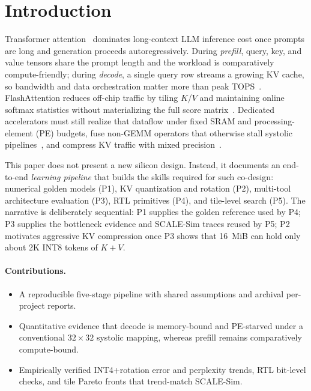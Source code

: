 \documentclass[conference]{IEEEtran}
\begin{document}
\section{Introduction}
\label{sec:intro}

Transformer attention~\cite{vaswani2017attention} dominates long-context LLM inference cost once prompts are long and generation proceeds autoregressively.
During \emph{prefill}, query, key, and value tensors share the prompt length and the workload is comparatively compute-friendly; during \emph{decode}, a single query row streams a growing KV cache, so bandwidth and data orchestration matter more than peak TOPS~\cite{dao2022flashattention,bitdecoding2025}.
FlashAttention reduces off-chip traffic by tiling $K$/$V$ and maintaining online softmax statistics without materializing the full score matrix~\cite{dao2022flashattention,dao2023flashattention2}.
Dedicated accelerators must still realize that dataflow under fixed SRAM and processing-element (PE) budgets, fuse non-GEMM operators that otherwise stall systolic pipelines~\cite{desa2025,lin2025systolicattention,stevens2021softermax}, and compress KV traffic with mixed precision~\cite{liu2024kivi,ashkboos2024quarot,liu2024spinquant}.

This paper does not present a new silicon design.
Instead, it documents an end-to-end \emph{learning pipeline} that builds the skills required for such co-design: numerical golden models (P1), KV quantization and rotation (P2), multi-tool architecture evaluation (P3), RTL primitives (P4), and tile-level search (P5).
The narrative is deliberately sequential: P1 supplies the golden reference used by P4; P3 supplies the bottleneck evidence and SCALE-Sim traces reused by P5; P2 motivates aggressive KV compression once P3 shows that 16~MiB can hold only about 2K INT8 tokens of $K{+}V$.

\paragraph{Contributions.}
\begin{itemize}
  \item A reproducible five-stage pipeline with shared assumptions and archival per-project reports.
  \item Quantitative evidence that decode is memory-bound and PE-starved under a conventional $32\times32$ systolic mapping, whereas prefill remains comparatively compute-bound.
  \item Empirically verified INT4+rotation error and perplexity trends, RTL bit-level checks, and tile Pareto fronts that trend-match SCALE-Sim.
\end{itemize}
\end{document}

